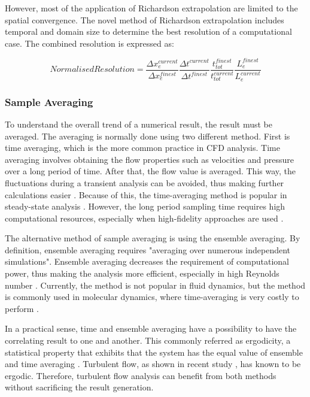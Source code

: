 However, most of the application of Richardson extrapolation are limited to the spatial convergence. The novel method of Richardson extrapolation includes temporal and domain size to determine the best resolution of a computational case. The combined resolution is expressed as:

\begin{equation}
	Normalised Resolution = \frac{\Delta x_e^{current}}{\Delta x_e^{finest}} \frac{\Delta t^{current}}{\Delta t^{finest}} \frac{t_{tot}^{finest}}{t_{tot}^{current}} \frac{L_e^{finest}}{L_e^{current}}
\end{equation}

\subsubsection{Sample Averaging}
To understand the overall trend of a numerical result, the result must be averaged. The averaging is normally done using two different method. First is time averaging, which is the more common practice in CFD analysis. Time averaging involves obtaining the flow properties such as velocities and pressure over a long period of time. After that, the flow value is averaged. This way, the fluctuations during a transient analysis can be avoided, thus making further calculations easier \cite{Kallio2015}. Because of this, the time-averaging method is popular in steady-state analysis \cite{Sodja2007}. However, the long period sampling time requires high computational resources, especially when high-fidelity approaches are used \cite{Makarashvili2016}.

The alternative method of sample averaging is using the ensemble averaging. By definition, ensemble averaging requires "averaging over numerous independent simulations"\cite{Tosi2021}. Ensemble averaging decreases the requirement of computational power, thus making the analysis more efficient, especially in high Reynolds number \cite{Makarashvili2016}. Currently, the method is not popular in fluid dynamics, but the method is commonly used in molecular dynamics, where time-averaging is very costly to perform \cite{Gordiz2015}.

In a practical sense, time and ensemble averaging have a possibility to have the correlating result to one and another. This commonly referred as ergodicity, a statistical property that exhibits that the system has the equal value of ensemble and time averaging \cite{Yamamoto2024}. Turbulent flow, as shown in recent study \cite{Galanti2004}, has known to be ergodic. Therefore, turbulent flow analysis can benefit from both methods without sacrificing the result generation.

